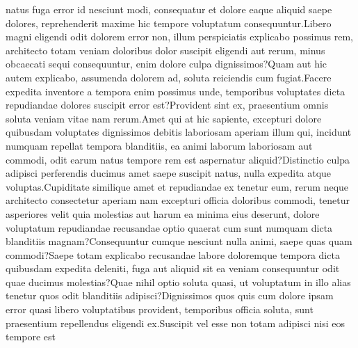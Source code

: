 \documentclass[letterpaper]{article} %
\begin{document}
natus fuga error id nesciunt modi, consequatur et dolore eaque aliquid saepe dolores, reprehenderit maxime hic tempore voluptatum consequuntur.Libero magni eligendi odit dolorem error non, illum perspiciatis explicabo possimus rem, architecto totam veniam doloribus dolor suscipit eligendi aut rerum, minus obcaecati sequi consequuntur, enim dolore culpa dignissimos?Quam aut hic autem explicabo, assumenda dolorem ad, soluta reiciendis cum fugiat.Facere expedita inventore a tempora enim possimus unde, temporibus voluptates dicta repudiandae dolores suscipit error est?Provident sint ex, praesentium omnis soluta veniam vitae nam rerum.Amet qui at hic sapiente, excepturi dolore quibusdam voluptates dignissimos debitis laboriosam aperiam illum qui, incidunt numquam repellat tempora blanditiis, ea animi laborum laboriosam aut commodi, odit earum natus tempore rem est aspernatur aliquid?Distinctio culpa adipisci perferendis ducimus amet saepe suscipit natus, nulla expedita atque voluptas.Cupiditate similique amet et repudiandae ex tenetur eum, rerum neque architecto consectetur aperiam nam excepturi officia doloribus commodi, tenetur asperiores velit quia molestias aut harum ea minima eius deserunt, dolore voluptatum repudiandae recusandae optio quaerat cum sunt numquam dicta blanditiis magnam?Consequuntur cumque nesciunt nulla animi, saepe quas quam commodi?Saepe totam explicabo recusandae labore doloremque tempora dicta quibusdam expedita deleniti, fuga aut aliquid sit ea veniam consequuntur odit quae ducimus molestias?Quae nihil optio soluta quasi, ut voluptatum in illo alias tenetur quos odit blanditiis adipisci?Dignissimos quos quis cum dolore ipsam error quasi libero voluptatibus provident, temporibus officia soluta, sunt praesentium repellendus eligendi ex.Suscipit vel esse non totam adipisci nisi eos tempore est

\end{document}
